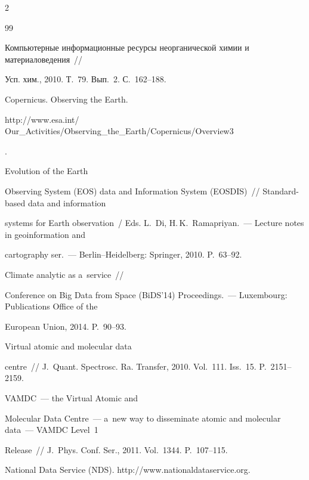 \begin{multicols}{2}
{{\begin{thebibliography}{99}


Компьютерные информационные ресурсы неорганической химии и материаловедения~//


Усп. хим., 2010. Т.~79. Вып.~2. С.~162--188.







Copernicus. Observing the Earth. {\sf 


http://www.esa.int/ Our\_Activities/Observing\_the\_Earth/Copernicus/\linebreak Overview3}.




 Evolution of the Earth 


Observing System (EOS) data and Information System (EOSDIS)~// Standard-based data and information 


systems for Earth observation~/ Eds. L.~Di, H.\,K.~Ramapriyan.~--- Lecture notes in geoinformation and 


cartography ser.~--- Berlin--Heidelberg: Springer, 2010. P.~63--92.




 Climate analytic as a~service~// 


Conference on Big Data from Space (BiDS'14) Proceedings.~--- Luxembourg: Publications Office of the 


European Union, 2014. P.~90--93.




 Virtual atomic and molecular data 


centre~// J.~Quant. Spectrosc. Ra. Transfer, 2010. Vol.~111. Iss.~15. P.~2151--2159.




 VAMDC~--- the Virtual Atomic and 


Molecular Data Centre~--- a~new way to disseminate atomic and molecular data~--- VAMDC Level~1 


Release~// J.~Phys. Conf. Ser., 2011. Vol.~1344. P.~107--115.




National Data Service (NDS). {\sf http://www.\linebreak nationaldataservice.org}.



\end{thebibliography}}}
\end{multicols}
